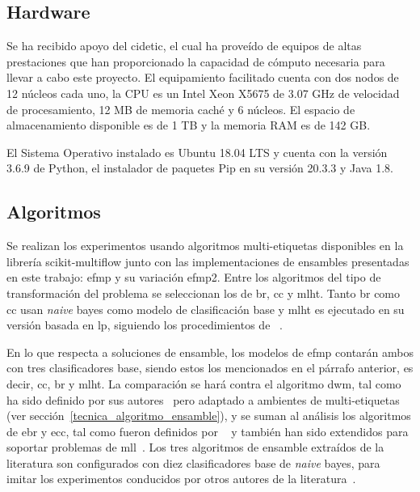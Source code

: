\subsection{Hardware}

Se ha recibido apoyo del \acrfull{cidetic}, el cual ha proveído de equipos de
altas prestaciones que han proporcionado la capacidad de cómputo necesaria para
llevar a cabo este proyecto. El equipamiento facilitado cuenta con dos nodos de
12 núcleos cada uno, la CPU es un Intel Xeon X5675 de 3.07 GHz de velocidad de
procesamiento, 12 MB de memoria caché y 6 núcleos. El espacio de almacenamiento
disponible es de 1 TB y la memoria RAM es de 142 GB\@.

El Sistema Operativo instalado es Ubuntu 18.04 LTS y cuenta con la versión 3.6.9
de Python, el instalador de paquetes Pip en su versión 20.3.3 y Java 1.8.

\subsection{Algoritmos}
\label{experimentos_algoritmos}

Se realizan los experimentos usando algoritmos multi-etiquetas disponibles en la
librería scikit-multiflow junto con las implementaciones de ensambles
presentadas en este trabajo: \acrfull{efmp} y su variación \acrshort{efmp2}.
Entre los algoritmos del tipo de transformación del problema se seleccionan los
de \acrfull{br}, \acrfull{cc} y \acrfull{mlht}. Tanto \acrshort{br} como
\acrshort{cc} usan \textit{naive} bayes como modelo de clasificación base y
\acrshort{mlht} es ejecutado en su versión basada en \acrfull{lp}, siguiendo los
procedimientos de \citeauthor{read_scalable_2012}~\cite{read_scalable_2012}.

En lo que respecta a soluciones de ensamble, los modelos de \acrshort{efmp}
contarán ambos con tres clasificadores base, siendo estos los mencionados en el
párrafo anterior, es decir, \acrshort{cc}, \acrshort{br} y \acrshort{mlht}. La
comparación se hará contra el algoritmo \acrfull{dwm}, tal como ha sido definido
por sus autores~\cite{kolter_dynamic_2007} pero adaptado a ambientes de
multi-etiquetas (ver sección~\ref{tecnica_algoritmo_ensamble}), y se suman al
análisis los algoritmos de \acrfull{ebr} y \acrfull{ecc}, tal como fueron
definidos por \citeauthor{oza_online_2005}~\cite{oza_online_2005} y también han
sido extendidos para soportar problemas de
\acrshort{mll}~\cite{read_classifier_2011}. Los tres algoritmos de ensamble
extraídos de la literatura son configurados con diez clasificadores base de
\textit{naive} bayes, para imitar los experimentos conducidos por otros autores
de la literatura~\cite{osojnik_multi-label_2017, read_scalable_2012,
	buyukcakir_novel_2018}.


